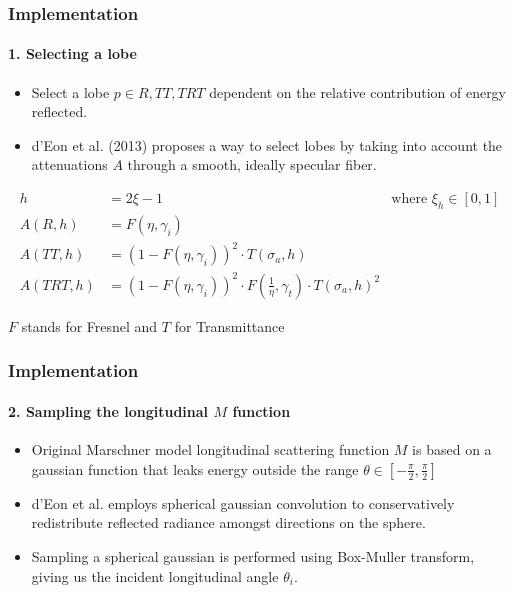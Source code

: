 \documentclass{beamer}
\begin{document}
  
  \begin{frame}
    \frametitle{Implementation}
    \framesubtitle{1. Selecting a lobe}
    
    \begin{itemize}
    \item Select a lobe $p \in {R, TT, TRT}$ dependent on the relative contribution of energy reflected.
    \item d'Eon et al. (2013) proposes a way to select lobes by taking into account the attenuations $A$ through a smooth, ideally specular fiber.
    \end{itemize}
    
    \begin{align*}
    h &= 2\xi - 1 &\textrm{where $\xi_h \in [0,1]$} \\
    A(R, h) &= F(\eta, \gamma_i) \\
    A(TT, h) &= (1 - F(\eta, \gamma_i))^2 \cdot T(\sigma_a, h) \\
    A(TRT, h) &= (1 - F(\eta, \gamma_i))^2 \cdot F(\frac{1}{\eta}, \gamma_t) \cdot T(\sigma_a, h)^2
    \end{align*}
    
    $F$ stands for Fresnel and $T$ for Transmittance
    
  \end{frame}
  
  \begin{frame}
  \frametitle{Implementation}
  \framesubtitle{2. Sampling the longitudinal $M$ function}

 \begin{itemize}
  \item Original Marschner model longitudinal scattering function $M$ is based on a gaussian function that leaks energy outside the range $\theta \in [-\frac{\pi}{2}, \frac{\pi}{2}]$
  \item d'Eon et al. employs spherical gaussian convolution to conservatively redistribute reflected radiance amongst directions on the sphere.
  \item Sampling a spherical gaussian is performed using Box-Muller transform, giving us the incident longitudinal angle $\theta_i$.
\end{itemize}


  \end{frame}
  
\end{document}
